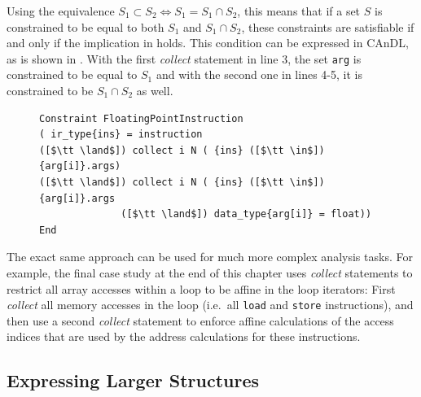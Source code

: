     Using the equivalence
    $S_1\subset S_2\iff S_1 = S_1\cap S_2$, this means that
    if a set $S$ is constrained to be equal to both $S_1$ and $S_1\cap S_2$,
    these constraints are satisfiable if and only if the implication in
     holds.
    This condition can be expressed in CAnDL, as is shown in
    .
    With the first {\it collect} statement in line 3, the set \texttt{arg} is
    constrained to be equal to $S_1$ and with the second one in lines 4-5, it
    is constrained to be $S_1\cap S_2$ as well.

\begin{figure}[H]
\begin{lstlisting}[language=CAnDL,label={fig:collectexample},caption=
   {{\it Collect} is used to restrict {\tt ins} to be calculated exclusively
    from floating point values.\leftskip=0pt\rightskip=0pt}]
Constraint FloatingPointInstruction
( ir_type{ins} = instruction
([$\tt \land$]) collect i N ( {ins} ([$\tt \in$]) {arg[i]}.args)
([$\tt \land$]) collect i N ( {ins} ([$\tt \in$]) {arg[i]}.args
              ([$\tt \land$]) data_type{arg[i]} = float))
End
\end{lstlisting}
\end{figure}

    The exact same approach can be used for much more complex analysis tasks.
    For example, the final case study at the end of this chapter uses
    {\it collect} statements to restrict all array accesses within a
    loop to be affine in the loop iterators:
    First {\it collect} all memory accesses in the loop
    (i.e.\ all \texttt{load} and \texttt{store} instructions), and then use a
    second {\it collect} statement to enforce affine calculations of the access
    indices that are used by the address calculations for these instructions.

\subsection{Expressing Larger Structures}

